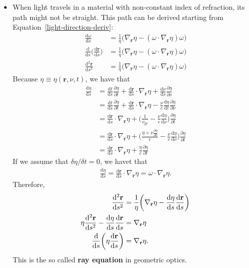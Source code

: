 \documentclass[10pt]{article}
\newcommand{\dee}{\mathrm{d}}
\newcommand{\ve}[1]{\mathbf{#1}}
\newcommand{\group}{\mathrm{gr}}
\begin{document}
\begin{itemize}
    \item When light travels in a material with non-constant index of refraction, its path might not be straight. This path can be derived starting from Equation~\eqref{light-direction-deriv}:
    \begin{align*}
      \frac{\dee \omega }{\dee s} 
      &= \frac{1}{\eta} \big( \nabla_{\ve{r}} \eta - (\omega \cdot \nabla_{\ve{r}} \eta) \omega \big)\\
      \frac{\dee }{\dee s} \bigg( \frac{\dee \ve{r}}{\dee s} \bigg)
      &= \frac{1}{\eta} \big( \nabla_{\ve{r}} \eta - (\omega \cdot \nabla_{\ve{r}} \eta) \omega \big)\\
      \frac{\dee^2 \ve{r}}{\dee s^2}
      &= \frac{1}{\eta} \big( \nabla_{\ve{r}} \eta - (\omega \cdot \nabla_{\ve{r}} \eta) \omega \big)
    \end{align*}
    Because $\eta \equiv \eta(\ve{r}, \nu, t)$, we have that
    \begin{align*}
      \frac{\dee \eta}{\dee s} 
      &= \frac{\dee t}{\dee s} \frac{\partial \eta}{\partial t} 
      + \frac{\dee \ve{r}}{\dee s} \cdot \nabla_{\ve{r}} \eta
      + \frac{\dee \nu}{\dee s} \frac{\partial \eta}{\partial \nu}\\
      &= \frac{\dee t}{\dee s} \frac{\partial \eta}{\partial t} 
      + \frac{\dee \ve{r}}{\dee s} \cdot \nabla_{\ve{r}} \eta
      - \frac{\nu}{c} \frac{\dee \eta}{\dee t} \frac{\partial \eta}{\partial \nu}\\
      &= \frac{\dee \ve{r}}{\dee s} \cdot \nabla_{\ve{r}} \eta
      + \bigg( \frac{1}{v_\group} - \frac{\nu}{c} \frac{\dee \eta}{\dee \nu} \bigg) \frac{\partial \eta}{\partial t}\\
      &= \frac{\dee \ve{r}}{\dee s} \cdot \nabla_{\ve{r}} \eta
      + \bigg( \frac{\eta + \nu \frac{\partial \eta}{\partial \nu}}{c} - \frac{\nu}{c} \frac{\dee \eta}{\dee \nu} \bigg) \frac{\partial \eta}{\partial t}\\
      &= \frac{\dee \ve{r}}{\dee s} \cdot \nabla_{\ve{r}} \eta
      + \frac{\eta}{c} \frac{\partial \eta}{\partial t}
    \end{align*}    
    If we assume that $\delta \eta / \delta t = 0$, we havet that
    \begin{align*}
      \frac{\dee \eta}{\dee s} 
      = \frac{\dee \ve{r}}{\dee s} \cdot \nabla_{\ve{r}} \eta 
      = \omega \cdot \nabla_{\ve{r}} \eta.
    \end{align*}
    Therefore,
    \begin{align}
      \frac{\dee^2 \ve{r}}{\dee s^2}
      &= \frac{1}{\eta}\bigg( \nabla_{\ve{r}} \eta - \frac{\dee \eta}{\dee s} \frac{\dee \ve{r}}{\dee s} \bigg) \notag\\
      \eta \frac{\dee^2 \ve{r}}{\dee s^2} - \frac{\dee \eta}{\dee s} \frac{\dee \ve{r}}{\dee s}
      &= \nabla_{\ve{r}} \eta \notag\\
      \frac{\dee }{\dee s}\bigg( \eta \frac{\dee \ve{r}}{\dee s} \bigg)
      &= \nabla_{\ve{r}} \eta. \label{ray-equation}
    \end{align}
    This is the so called \textbf{ray equation} in geometric optics.

  \end{itemize}
\end{document}
